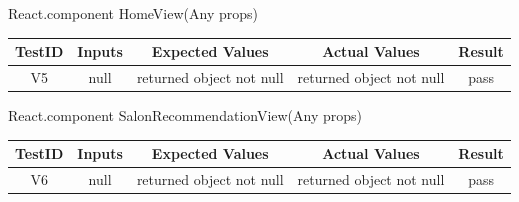 \documentclass[12pt, oneside, openany, titlepage]{article}
\begin{document}
React.component HomeView(Any props) \\
\begin{tabular}{ |c|c|c|c|c| } 
 \hline
 TestID & Inputs & Expected Values & Actual Values & Result \\ 
 \hline
 V5 & null & returned object not null & returned object not null & pass \\ 
 \hline
\end{tabular}

React.component SalonRecommendationView(Any props) \\
\begin{tabular}{ |c|c|c|c|c| } 
 \hline
 TestID & Inputs & Expected Values & Actual Values & Result \\ 
 \hline
 V6 & null & returned object not null & returned object not null & pass \\ 
 \hline
\end{tabular}
\end{document}
